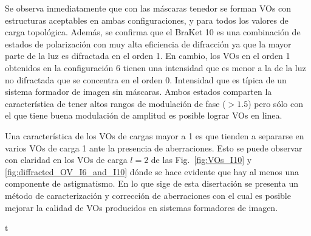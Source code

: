 Se observa inmediatamente que con las máscaras tenedor se forman VOs
con estructuras aceptables en ambas
configuraciones, y para todos los valores de carga topológica. Además,
se confirma que el BraKet 10 es una combinación de
estados de polarización con muy alta eficiencia de difracción ya que
la mayor parte de la luz es difractada en el orden 1. En cambio, los
VOs en el orden 1 obtenidos en la configuración 6 tienen una
intensidad que es menor a la de la luz no difractada que se concentra
en el orden 0. Intensidad que es típica de un sistema formador de
imagen sin máscaras. Ambos estados comparten la característica de
tener altos rangos de modulación de fase ($>1.5$) pero sólo con el que
tiene buena modulación de amplitud es posible lograr VOs en linea. 

Una característica de los VOs de cargas mayor a 1 es que tienden a
separarse en varios VOs de carga 1 ante la presencia de
aberraciones. Esto se puede observar con claridad en los VOs de carga
$l=2$ de las Fig.~\ref{fig:VOs_I10} y
\ref{fig:diffracted_OV_I6_and_I10} dónde se hace evidente que hay al menos una componente
de astigmatismo.  En lo que sige de esta disertación se presenta un
método de caracterización y corrección de aberraciones con el cual es
posible mejorar la calidad de VOs producidos en sistemas formadores de
imagen. 

\newpage
\pagebreak[4]
t
